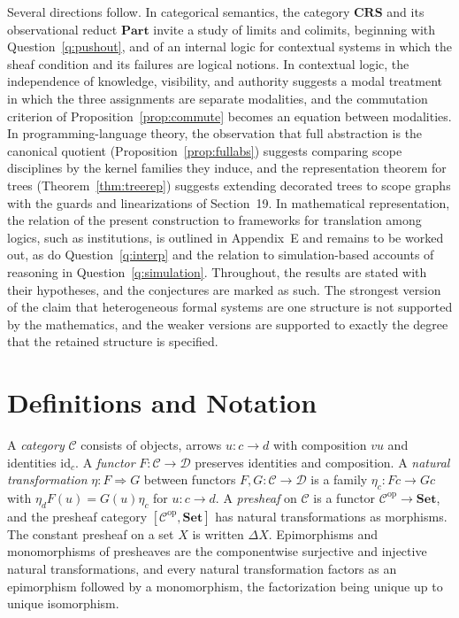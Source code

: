 \documentclass[11pt]{article}
\theoremstyle{definition}
\theoremstyle{remark}
\newcommand{\cC}{\mathcal C}
\newcommand{\cD}{\mathcal D}
\newcommand{\Set}{\mathbf{Set}}
\newcommand{\CRS}{\mathbf{CRS}}
\newcommand{\Part}{\mathbf{Part}}
\newcommand{\op}{\mathrm{op}}
\newcommand{\id}{\mathrm{id}}
\begin{document}
Several directions follow. In categorical semantics, the category $\CRS$ and its observational reduct $\Part$ invite a study of limits and colimits, beginning with Question~\ref{q:pushout}, and of an internal logic for contextual systems in which the sheaf condition and its failures are logical notions. In contextual logic, the independence of knowledge, visibility, and authority suggests a modal treatment in which the three assignments are separate modalities, and the commutation criterion of Proposition~\ref{prop:commute} becomes an equation between modalities. In programming-language theory, the observation that full abstraction is the canonical quotient (Proposition~\ref{prop:fullabs}) suggests comparing scope disciplines by the kernel families they induce, and the representation theorem for trees (Theorem~\ref{thm:treerep}) suggests extending decorated trees to scope graphs with the guards and linearizations of Section~19. In mathematical representation, the relation of the present construction to frameworks for translation among logics, such as institutions, is outlined in Appendix~E and remains to be worked out, as do Question~\ref{q:interp} and the relation to simulation-based accounts of reasoning in Question~\ref{q:simulation}. Throughout, the results are stated with their hypotheses, and the conjectures are marked as such. The strongest version of the claim that heterogeneous formal systems are one structure is not supported by the mathematics, and the weaker versions are supported to exactly the degree that the retained structure is specified.
\appendix

\section{Definitions and Notation}

A \emph{category} $\cC$ consists of objects, arrows $u:c\to d$ with composition $vu$ and identities $\id_c$. A \emph{functor} $F:\cC\to\cD$ preserves identities and composition. A \emph{natural transformation} $\eta:F\Rightarrow G$ between functors $F,G:\cC\to\cD$ is a family $\eta_c:Fc\to Gc$ with $\eta_dF(u)=G(u)\eta_c$ for $u:c\to d$. A \emph{presheaf} on $\cC$ is a functor $\cC^{\op}\to\Set$, and the presheaf category $[\cC^{\op},\Set]$ has natural transformations as morphisms. The constant presheaf on a set $X$ is written $\Delta X$. Epimorphisms and monomorphisms of presheaves are the componentwise surjective and injective natural transformations, and every natural transformation factors as an epimorphism followed by a monomorphism, the factorization being unique up to unique isomorphism.
\end{document}
